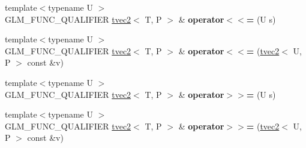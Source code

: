 \begin{DoxyCompactItemize}
\item 
\hypertarget{structglm_1_1detail_1_1tvec2_a5e89548db90fffa27f6076b2a94f83d7}{{\footnotesize template$<$typename U $>$ }\\G\-L\-M\-\_\-\-F\-U\-N\-C\-\_\-\-Q\-U\-A\-L\-I\-F\-I\-E\-R \hyperlink{structglm_1_1detail_1_1tvec2}{tvec2}$<$ T, P $>$ \& {\bfseries operator$<$$<$=} (U s)}\label{structglm_1_1detail_1_1tvec2_a5e89548db90fffa27f6076b2a94f83d7}

\item 
\hypertarget{structglm_1_1detail_1_1tvec2_a501a88775ae24755acb58b2572cc3ec9}{{\footnotesize template$<$typename U $>$ }\\G\-L\-M\-\_\-\-F\-U\-N\-C\-\_\-\-Q\-U\-A\-L\-I\-F\-I\-E\-R \hyperlink{structglm_1_1detail_1_1tvec2}{tvec2}$<$ T, P $>$ \& {\bfseries operator$<$$<$=} (\hyperlink{structglm_1_1detail_1_1tvec2}{tvec2}$<$ U, P $>$ const \&v)}\label{structglm_1_1detail_1_1tvec2_a501a88775ae24755acb58b2572cc3ec9}

\item 
\hypertarget{structglm_1_1detail_1_1tvec2_a7827364730dbfab98293a22f1c3a73d1}{{\footnotesize template$<$typename U $>$ }\\G\-L\-M\-\_\-\-F\-U\-N\-C\-\_\-\-Q\-U\-A\-L\-I\-F\-I\-E\-R \hyperlink{structglm_1_1detail_1_1tvec2}{tvec2}$<$ T, P $>$ \& {\bfseries operator$>$$>$=} (U s)}\label{structglm_1_1detail_1_1tvec2_a7827364730dbfab98293a22f1c3a73d1}

\item 
\hypertarget{structglm_1_1detail_1_1tvec2_afbc6fa3075b872f1a10c5ad97e08b012}{{\footnotesize template$<$typename U $>$ }\\G\-L\-M\-\_\-\-F\-U\-N\-C\-\_\-\-Q\-U\-A\-L\-I\-F\-I\-E\-R \hyperlink{structglm_1_1detail_1_1tvec2}{tvec2}$<$ T, P $>$ \& {\bfseries operator$>$$>$=} (\hyperlink{structglm_1_1detail_1_1tvec2}{tvec2}$<$ U, P $>$ const \&v)}\label{structglm_1_1detail_1_1tvec2_afbc6fa3075b872f1a10c5ad97e08b012}

\end{DoxyCompactItemize}
